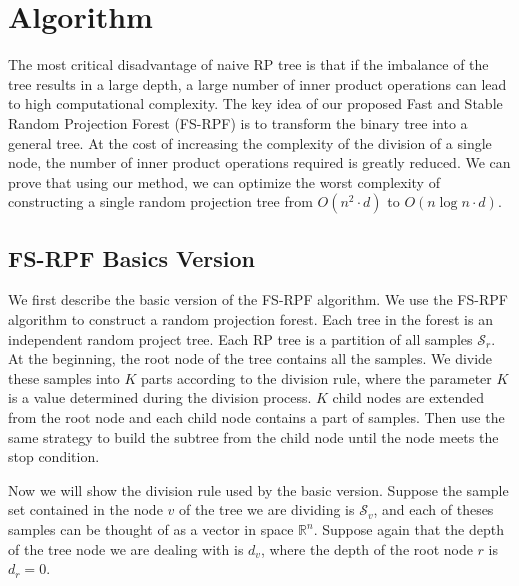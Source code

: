 \section{Algorithm}
The most critical disadvantage of naive RP tree is that if the imbalance of the tree results in a large depth, a large number of inner product operations can lead to high computational complexity. 
The key idea of our proposed Fast and Stable Random Projection Forest (FS-RPF) is to transform the binary tree into a general tree. At the cost of increasing the complexity of the division of a single node, the number of inner product operations required is greatly reduced.
We can prove that using our method, we can optimize the worst complexity of constructing a single random projection tree from $O(n^2\cdot d)$ to $O(n\log n\cdot d)$.

\subsection{FS-RPF Basics Version}
We first describe the basic version of the FS-RPF algorithm. We use the FS-RPF algorithm to construct a random projection forest. Each tree in the forest is an independent random project tree. 
Each RP tree is a partition of all samples $\mathcal{S}_r$. At the beginning, the root node of the tree contains all the samples. We divide these samples into $K$ parts according to the division rule, where the parameter $K$ is a value determined during the division process. $K$ child nodes are extended from the root node and each child node contains a part of samples. Then use the same strategy to build the subtree from the child node until the node meets the stop condition.

Now we will show the division rule used by the basic version. Suppose the sample set contained in the node $v$ of the tree we are dividing is $\mathcal{S}_v$, and each of theses samples can be thought of as a vector in space $\mathbb{R}^n$. Suppose again that the depth of the tree node we are dealing with is $d_v$, where the depth of the root node $r$ is $d_r=0$.

